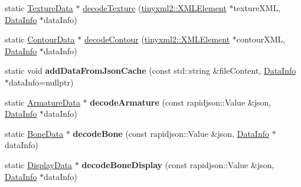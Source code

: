 \begin{DoxyCompactItemize}
\item 
static \hyperlink{classcocostudio_1_1TextureData}{Texture\+Data} $\ast$ \hyperlink{classcocostudio_1_1DataReaderHelper_a31a65a518dc66f8bb9145c0a3ad615af}{decode\+Texture} (\hyperlink{classtinyxml2_1_1XMLElement}{tinyxml2\+::\+X\+M\+L\+Element} $\ast$texture\+X\+ML, \hyperlink{structcocostudio_1_1DataReaderHelper_1_1__DataInfo}{Data\+Info} $\ast$data\+Info)
\item 
static \hyperlink{classcocostudio_1_1ContourData}{Contour\+Data} $\ast$ \hyperlink{classcocostudio_1_1DataReaderHelper_ad5f702d54a02315ac7d4f4d5dfdd3464}{decode\+Contour} (\hyperlink{classtinyxml2_1_1XMLElement}{tinyxml2\+::\+X\+M\+L\+Element} $\ast$contour\+X\+ML, \hyperlink{structcocostudio_1_1DataReaderHelper_1_1__DataInfo}{Data\+Info} $\ast$data\+Info)
\item 
\mbox{\label{classcocostudio_1_1DataReaderHelper_a40589786b2caf032ccfa275a4b5099ea}} 
static void {\bfseries add\+Data\+From\+Json\+Cache} (const std\+::string \&file\+Content, \hyperlink{structcocostudio_1_1DataReaderHelper_1_1__DataInfo}{Data\+Info} $\ast$data\+Info=nullptr)
\item 
\mbox{\label{classcocostudio_1_1DataReaderHelper_a08bde7be23fac0b298bf7611f87970b3}} 
static \hyperlink{classcocostudio_1_1ArmatureData}{Armature\+Data} $\ast$ {\bfseries decode\+Armature} (const rapidjson\+::\+Value \&json, \hyperlink{structcocostudio_1_1DataReaderHelper_1_1__DataInfo}{Data\+Info} $\ast$data\+Info)
\item 
\mbox{\label{classcocostudio_1_1DataReaderHelper_af185653c3903ff947db5c7fbba47619a}} 
static \hyperlink{classcocostudio_1_1BoneData}{Bone\+Data} $\ast$ {\bfseries decode\+Bone} (const rapidjson\+::\+Value \&json, \hyperlink{structcocostudio_1_1DataReaderHelper_1_1__DataInfo}{Data\+Info} $\ast$data\+Info)
\item 
\mbox{\label{classcocostudio_1_1DataReaderHelper_a0cb86ec66e379edbc7ad9c886b610f71}} 
static \hyperlink{classcocostudio_1_1DisplayData}{Display\+Data} $\ast$ {\bfseries decode\+Bone\+Display} (const rapidjson\+::\+Value \&json, \hyperlink{structcocostudio_1_1DataReaderHelper_1_1__DataInfo}{Data\+Info} $\ast$data\+Info)
\item 

\end{DoxyCompactItemize}
